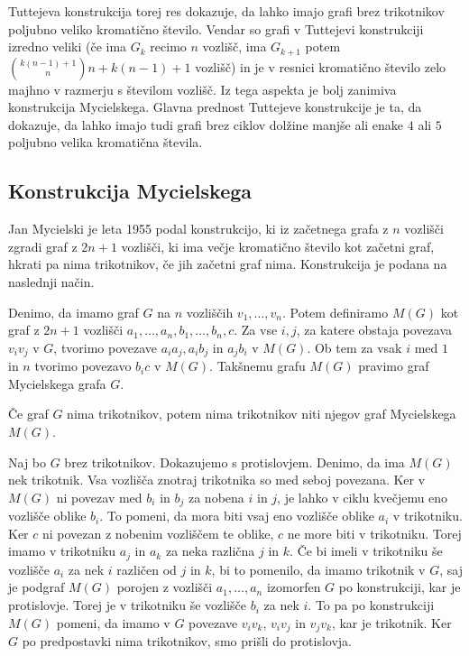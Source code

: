 \documentclass[mat1, tisk]{fmfdelo}
\begin{document}
Tuttejeva konstrukcija torej res dokazuje, da lahko imajo grafi brez trikotnikov poljubno veliko kromatično število. Vendar so grafi v Tuttejevi konstrukciji
izredno veliki (če ima $G_k$ recimo $n$ vozlišč, ima $G_{k+1}$ potem $\binom{k(n-1)+1}{n}n + k(n-1) + 1$ vozlišč) in je v resnici kromatično število zelo majhno 
v razmerju s številom vozlišč. Iz tega aspekta je bolj zanimiva konstrukcija Mycielskega. Glavna prednost Tuttejeve konstrukcije je ta, da dokazuje, da lahko imajo 
tudi grafi brez ciklov dolžine manjše ali enake $4$ ali $5$ poljubno velika kromatična števila.

\subsection{Konstrukcija Mycielskega}
Jan Mycielski je leta 1955 podal konstrukcijo, ki iz začetnega grafa z $n$ vozlišči zgradi graf z $2n + 1$ vozlišči, ki ima večje kromatično število kot
začetni graf, hkrati pa nima trikotnikov, če jih začetni graf nima. Konstrukcija je podana na naslednji način.

Denimo, da imamo graf $G$ na $n$ vozliščih ${v_1, \ldots, v_n}$. Potem definiramo $M(G)$ kot graf z $2n + 1$ vozlišči ${a_1, \ldots, a_n, b_1, \ldots, b_n, c}$. 
Za vse $i, j$, za katere obstaja povezava $v_iv_j$ v $G$, tvorimo povezave $a_ia_j, a_ib_j$ in $a_jb_i$ v $M(G)$. Ob tem za vsak $i$ med $1$ in $n$ tvorimo 
povezavo $b_ic$ v $M(G)$. Takšnemu grafu $M(G)$ pravimo graf Mycielskega grafa $G$.

    \begin{trditev}
        Če graf $G$ nima trikotnikov, potem nima trikotnikov niti njegov graf Mycielskega $M(G)$.
    \end{trditev}

    \begin{dokaz}
        Naj bo $G$ brez trikotnikov. Dokazujemo s protislovjem. Denimo, da ima $M(G)$ nek trikotnik. Vsa vozlišča znotraj trikotnika so med seboj povezana. Ker v $M(G)$ ni povezav med 
        $b_i$ in $b_j$ za nobena $i$ in $j$, je lahko v ciklu kvečjemu eno vozlišče oblike $b_i$. To pomeni, da mora biti vsaj eno vozlišče oblike $a_i$ v trikotniku.
        Ker $c$ ni povezan z nobenim vozliščem te oblike, $c$ ne more biti v trikotniku. Torej imamo v trikotniku $a_j$ in $a_k$ za neka različna $j$ in $k$. Če bi imeli v
        trikotniku še vozlišče $a_i$ za nek $i$ različen od $j$ in $k$, bi to pomenilo, da imamo trikotnik v $G$, saj je podgraf $M(G)$ porojen z vozlišči ${a_1, \ldots, a_n}$
        izomorfen $G$ po konstrukciji, kar je protislovje. Torej je v trikotniku še vozlišče $b_i$ za nek $i$. To pa po konstrukciji $M(G)$ pomeni, da imamo v $G$ povezave $v_iv_k$, $v_iv_j$
        in $v_jv_k$, kar je trikotnik. Ker $G$ po predpostavki nima trikotnikov, smo prišli do protislovja.
    \end{dokaz}
\end{document}
